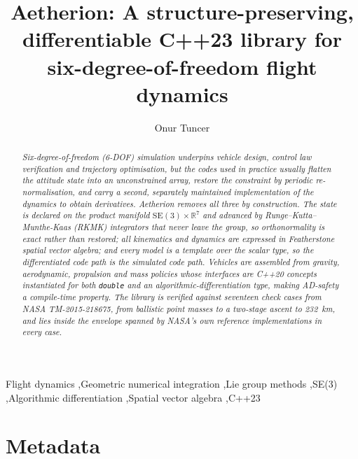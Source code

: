 \documentclass[preprint,12pt,a4paper]{elsarticle}
\newcommand{\SE}{\mathrm{SE}(3)}
\newcommand{\R}{\mathbb{R}}
\newcommand{\code}[1]{\texttt{\small #1}}
\begin{document}
\begin{frontmatter}

\title{Aetherion: A structure-preserving, differentiable {C}++23 library for
       six-degree-of-freedom flight dynamics}

\author[label1]{Onur Tuncer}
\address[label1]{Department of Aerospace Engineering, Istanbul Technical
  University, Maslak, 34469 Istanbul, T\"urkiye}

\begin{abstract}
\textit{Six-degree-of-freedom (6-DOF) simulation underpins vehicle design,
control law verification and trajectory optimisation, but the codes used in
practice usually flatten the attitude state into an unconstrained array,
restore the constraint by periodic re-normalisation, and carry a second,
separately maintained implementation of the dynamics to obtain derivatives.
Aetherion removes all three by construction. The state is declared on the
product manifold $\SE \times \R^{7}$ and advanced by
Runge--Kutta--Munthe-Kaas (RKMK) integrators that never leave the group, so
orthonormality is exact rather than restored; all kinematics and dynamics are
expressed in Featherstone spatial vector algebra; and every model is a template
over the scalar type, so the differentiated code path \emph{is} the simulated
code path. Vehicles are assembled from gravity, aerodynamic, propulsion and
mass policies whose interfaces are C++20 concepts instantiated for both
\code{double} and an algorithmic-differentiation type, making AD-safety a
compile-time property. The library is verified against seventeen check cases
from NASA TM-2015-218675, from ballistic point masses to a two-stage ascent to
\SI{232}{\kilo\metre}, and lies inside the envelope spanned by NASA's own
reference implementations in every case.}
\end{abstract}

\begin{keyword}
Flight dynamics \sep Geometric numerical integration \sep Lie group methods
\sep SE(3) \sep Algorithmic differentiation \sep Spatial vector algebra
\sep C++23
\end{keyword}

\end{frontmatter}

\section*{Metadata}
\label{}
\end{document}
